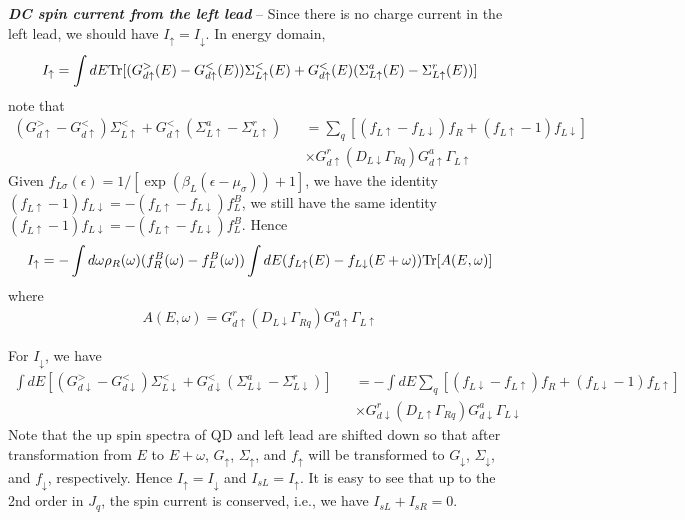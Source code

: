 \documentclass[aps,prb,superscriptaddress]{revtex4-2}
\begin{document}
{\noindent \bf{\textit{DC spin current from the left lead}}} -- Since there is no charge current in the left lead, we should have $I_\uparrow= I_\downarrow$. In energy domain,
\begin{eqnarray}
I_\uparrow = \int dE {\rm Tr} [(G_{d\uparrow}^>(E)-G_{d\uparrow}^<(E))\Sigma^<_{L\uparrow}(E) +G_{d\uparrow}^<(E) (\Sigma_{L\uparrow}^a(E) -\Sigma_{L\uparrow}^r(E))] \label{up1}
\end{eqnarray}
note that
\begin{eqnarray}
(G_{d\uparrow}^>-G_{d\uparrow}^< )\Sigma_{L\uparrow}^< +G_{d\uparrow}^< (\Sigma_{L\uparrow}^a-\Sigma_{L\uparrow}^r)&&=\sum_q [(f_{L\uparrow}-f_{L\downarrow})f_R+(f_{L\uparrow}-1)f_{L\downarrow}]\nonumber\\
&&\times G^r_{d\uparrow} (D_{L\downarrow} \Gamma_{Rq}) G^a_{d\uparrow}\Gamma_{L\uparrow} \nonumber
\end{eqnarray}
Given $f_{L\sigma}(\epsilon) = 1/[\exp(\beta_L (\epsilon-\mu_\sigma))+1]$, we have the identity $(f_{L\uparrow}-1)f_{L\downarrow}= -(f_{L\uparrow}-f_{L\downarrow})f^B_L$, we still have the same identity $(f_{L\uparrow}-1)f_{L\downarrow}= -(f_{L\uparrow}-f_{L\downarrow})f^B_L$. Hence
\begin{eqnarray}\label{eq:Iup}
I_\uparrow = -\int d\omega \rho_R(\omega) (f^B_R(\omega)-f^B_L(\omega))\int dE (f_{L\uparrow}(E)-f_{L\downarrow}(E+\omega)) {\rm Tr}[A(E,\omega)] \label{spin5}
\end{eqnarray}
where
\begin{eqnarray}
A(E,\omega)=G^r_{d\uparrow} (D_{L\downarrow} \Gamma_{Rq}) G^a_{d\uparrow}\Gamma_{L\uparrow} \nonumber
\end{eqnarray}

For $I_\downarrow$, we have
\begin{eqnarray}
\int dE [(G_{d\downarrow}^>-G_{d\downarrow}^< )\Sigma_{L\downarrow}^< +G_{d\downarrow}^< (\Sigma_{L\downarrow}^a-\Sigma_{L\downarrow}^r)]&&=-\int dE \sum_q [(f_{L\downarrow}-f_{L\uparrow})f_R+(f_{L\downarrow}-1)f_{L\uparrow}]\nonumber\\
&&\times G^r_{d\downarrow} (D_{L\uparrow} \Gamma_{Rq}) G^a_{d\downarrow}\Gamma_{L\downarrow} \nonumber
\end{eqnarray}
Note that the up spin spectra of QD and left lead are shifted down so that after transformation from $E$ to $E+\omega$, $G_\uparrow$, $\Sigma_\uparrow$, and $f_\uparrow$ will be transformed to $G_\downarrow$, $\Sigma_\downarrow$, and $f_\downarrow$, respectively. Hence $I_\uparrow = I_\downarrow$ and $I_{sL} = I_\uparrow$. It is easy to see that up to the 2nd order in $J_q$, the spin current is conserved, i.e., we have $I_{sL} + I_{sR}=0$.
\end{document}
